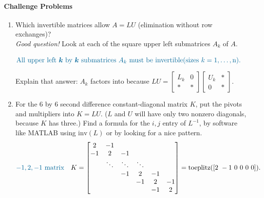 \documentclass[14pt, a4paper]{article}
\begin{document}
\paragraph{Challenge Problems}
\begin{enumerate}[resume]

    \item Which invertible matrices allow $A = LU$ (elimination without row exchanges)?\\
          \textit{Good question!} Look at each of the square upper left submatrices $A_k$ of $A$.

          $
              \color{blue!60!green}\text{All upper left } \boldsymbol{k} \text{ by }  \boldsymbol{k} \text{ submatrices } A_k \text{ must be invertible}\text{(sizes }k=1,\dots,\text{n)}.
          $


          Explain that answer: $A_k$ factors into \underline{\hspace{4em}} because
          $LU = \begin{bmatrix} L_k & 0 \\ * & * \end{bmatrix} \begin{bmatrix} U_k & * \\ 0 & * \end{bmatrix}$.

    \item For the 6 by 6 second difference constant-diagonal matrix $K$, put the pivots and multipliers into $K = LU$. ($L$ and $U$ will have only two nonzero diagonals, because $K$ has three.) Find a formula for the $i,j$ entry of $L^{-1}$, by software like \textcolor{blue!60!white}{MATLAB} using $\text{inv}(L)$ or by looking for a nice pattern.
          \[
              {\color{blue!60!green}\text{$-1,2,-1$ matrix}}\quad
              K = \begin{bmatrix}
                  2  & -1     &        &        &    &    \\
                  -1 & 2      & -1     &        &    &    \\
                     & \ddots & \ddots & \ddots &    &    \\
                     &        & -1     & 2      & -1 &    \\
                     &        &        & -1     & 2  & -1 \\
                     &        &        &        & -1 & 2
              \end{bmatrix}
              = \text{toeplitz}([2\ -1\ 0\ 0\ 0\ 0]).
          \]


\end{enumerate}
\end{document}
